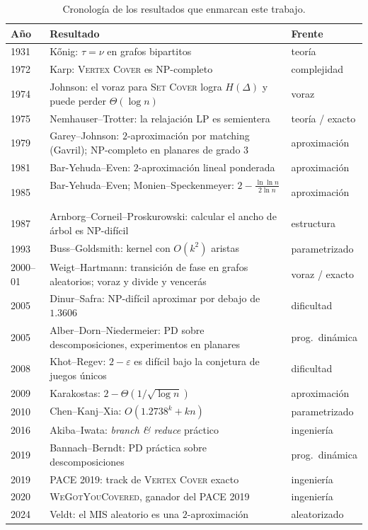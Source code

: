 \begin{table}[!htbp]
\centering\small
\begin{tabularx}{\textwidth}{@{}l>{\raggedright\arraybackslash}X l@{}}
\toprule
Año & Resultado & Frente \\
\midrule
1931 & Kőnig: $\tau=\nu$ en grafos bipartitos~\citep{konig1931} & teoría \\
1972 & Karp: \textsc{Vertex Cover} es NP-completo~\citep{karp1972} & complejidad \\
1974 & Johnson: el voraz para \textsc{Set Cover} logra $H(\Delta)$ y puede perder $\Theta(\log n)$~\citep{johnson1974} & voraz \\
1975 & Nemhauser--Trotter: la relajación LP es semientera~\citep{nemhauser1975} & teoría / exacto \\
1979 & Garey--Johnson: $2$-aproximación por matching (Gavril); NP-completo en planares de grado 3~\citep{garey1979} & aproximación \\
1981 & Bar-Yehuda--Even: $2$-aproximación lineal ponderada~\citep{baryehuda1981} & aproximación \\
1985 & Bar-Yehuda--Even; Monien--Speckenmeyer: $2-\frac{\ln\ln n}{2\ln n}$~\citep{baryehuda1985,monien1985} & aproximación \\
1987 & Arnborg--Corneil--Proskurowski: calcular el ancho de árbol es NP-difícil~\citep{arnborg1987} & estructura \\
1993 & Buss--Goldsmith: kernel con $O(k^2)$ aristas~\citep{buss1993} & parametrizado \\
2000--01 & Weigt--Hartmann: transición de fase en grafos aleatorios; voraz y divide y vencerás~\citep{weigt2000,weigt2001} & voraz / exacto \\
2005 & Dinur--Safra: NP-difícil aproximar por debajo de $1.3606$~\citep{dinur2005} & dificultad \\
2005 & Alber--Dorn--Niedermeier: PD sobre descomposiciones, experimentos en planares~\citep{alber2005} & prog.\ dinámica \\
2008 & Khot--Regev: $2-\varepsilon$ es difícil bajo la conjetura de juegos únicos~\citep{khot2008} & dificultad \\
2009 & Karakostas: $2-\Theta(1/\sqrt{\log n})$~\citep{karakostas2009} & aproximación \\
2010 & Chen--Kanj--Xia: $O(1.2738^k+kn)$~\citep{chen2010} & parametrizado \\
2016 & Akiba--Iwata: \emph{branch \& reduce} práctico~\citep{akiba2016} & ingeniería \\
2019 & Bannach--Berndt: PD práctica sobre descomposiciones~\citep{bannach2019} & prog.\ dinámica \\
2019 & PACE 2019: track de \textsc{Vertex Cover} exacto~\citep{dzulfikar2019} & ingeniería \\
2020 & \textsc{WeGotYouCovered}, ganador del PACE 2019~\citep{hespe2020} & ingeniería \\
2024 & Veldt: el MIS aleatorio es una $2$-aproximación~\citep{veldt2024} & aleatorizado \\
\bottomrule
\end{tabularx}
\caption{Cronología de los resultados que enmarcan este trabajo.}
\label{tab:historia}
\end{table}

